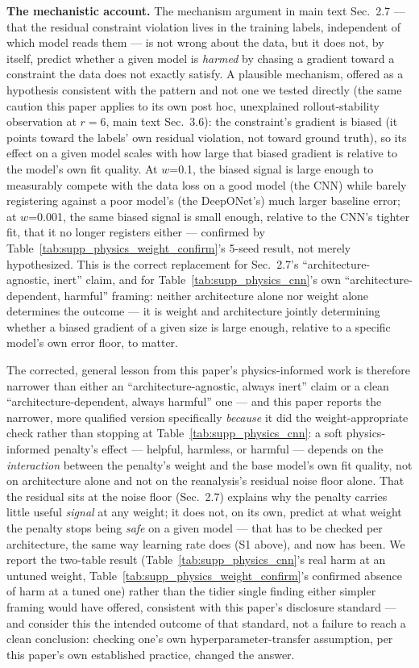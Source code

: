 \documentclass[11pt]{article}
\begin{document}
\textbf{The mechanistic account.} The mechanism argument in main text Sec.~2.7 --- that the residual constraint violation lives in the training labels, independent of which model reads them --- is not wrong about the data, but it does not, by itself, predict whether a given model is \textit{harmed} by chasing a gradient toward a constraint the data does not exactly satisfy. A plausible mechanism, offered as a hypothesis consistent with the pattern and not one we tested directly (the same caution this paper applies to its own post hoc, unexplained rollout-stability observation at $r=6$, main text Sec.~3.6): the constraint's gradient is biased (it points toward the labels' own residual violation, not toward ground truth), so its effect on a given model scales with how large that biased gradient is relative to the model's own fit quality. At $w$=0.1, the biased signal is large enough to measurably compete with the data loss on a good model (the CNN) while barely registering against a poor model's (the DeepONet's) much larger baseline error; at $w$=0.001, the same biased signal is small enough, relative to the CNN's tighter fit, that it no longer registers either --- confirmed by Table~\ref{tab:supp_physics_weight_confirm}'s 5-seed result, not merely hypothesized. This is the correct replacement for Sec.~2.7's ``architecture-agnostic, inert'' claim, and for Table~\ref{tab:supp_physics_cnn}'s own ``architecture-dependent, harmful'' framing: neither architecture alone nor weight alone determines the outcome --- it is weight and architecture jointly determining whether a biased gradient of a given size is large enough, relative to a specific model's own error floor, to matter.

The corrected, general lesson from this paper's physics-informed work is therefore narrower than either an ``architecture-agnostic, always inert'' claim or a clean ``architecture-dependent, always harmful'' one --- and this paper reports the narrower, more qualified version specifically \textit{because} it did the weight-appropriate check rather than stopping at Table~\ref{tab:supp_physics_cnn}: a soft physics-informed penalty's effect --- helpful, harmless, or harmful --- depends on the \textit{interaction} between the penalty's weight and the base model's own fit quality, not on architecture alone and not on the reanalysis's residual noise floor alone. That the residual sits at the noise floor (Sec.~2.7) explains why the penalty carries little useful \textit{signal} at any weight; it does not, on its own, predict at what weight the penalty stops being \textit{safe} on a given model --- that has to be checked per architecture, the same way learning rate does (S1 above), and now has been. We report the two-table result (Table~\ref{tab:supp_physics_cnn}'s real harm at an untuned weight, Table~\ref{tab:supp_physics_weight_confirm}'s confirmed absence of harm at a tuned one) rather than the tidier single finding either simpler framing would have offered, consistent with this paper's disclosure standard --- and consider this the intended outcome of that standard, not a failure to reach a clean conclusion: checking one's own hyperparameter-transfer assumption, per this paper's own established practice, changed the answer.
\end{document}
